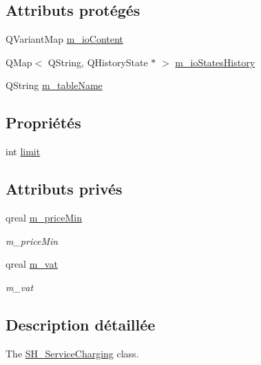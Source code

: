 \subsection*{Attributs protégés}
\begin{DoxyCompactItemize}
\item 
Q\-Variant\-Map \hyperlink{classSH__InOutStateMachine_a8cfbc27eef057bf37b7711bdfef2077e}{m\-\_\-io\-Content}
\item 
Q\-Map$<$ Q\-String, Q\-History\-State $\ast$ $>$ \hyperlink{classSH__InOutStateMachine_ac46ad1af230e1b2156d805275690dec3}{m\-\_\-io\-States\-History}
\item 
Q\-String \hyperlink{classSH__InOutStateMachine_aa009eecc5ab6181358faafb5996b6006}{m\-\_\-table\-Name}
\end{DoxyCompactItemize}
\subsection*{Propriétés}
\begin{DoxyCompactItemize}
\item 
int \hyperlink{classSH__LoopingInOutStateMachine_a7b61682544bd06b52020df3e0d801d21}{limit}
\end{DoxyCompactItemize}
\subsection*{Attributs privés}
\begin{DoxyCompactItemize}
\item 
qreal \hyperlink{classSH__ServiceCharging_a44584a7ff1edd6ae03c4f77544136c13}{m\-\_\-price\-Min}
\begin{DoxyCompactList}\small\item\em m\-\_\-price\-Min \end{DoxyCompactList}\item 
qreal \hyperlink{classSH__ServiceCharging_ae2fa75c56883dc4af6b0bbcbb86d0861}{m\-\_\-vat}
\begin{DoxyCompactList}\small\item\em m\-\_\-vat \end{DoxyCompactList}\end{DoxyCompactItemize}


\subsection{Description détaillée}
The \hyperlink{classSH__ServiceCharging}{S\-H\-\_\-\-Service\-Charging} class. 

